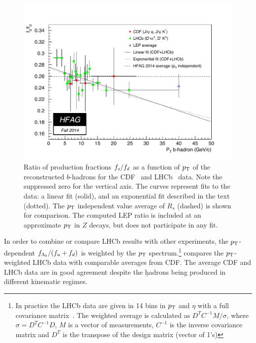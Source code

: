 \begin{figure}
 \begin{center}
  \includegraphics[width=\textwidth]{figures/life_mix/rs_comb}
  \caption{Ratio of production fractions $f_{s}/f_{d}$ as 
   a function of $p_{\rm T}$ of the reconstructed $b$-hadrons for the 
   CDF~\cite{CDFnote10795:2012} and LHCb~\cite{Aaij:2013qqa}
   data. Note the suppressed zero for the vertical axis.
   The curves represent fits to the data:
   a linear fit (solid), and an exponential fit described in the text (dotted).
   The $p_{\rm T}$ independent value average of $R_s$ (dashed) is shown for 
   comparison.
   The computed LEP ratio is included at an 
   approximate $p_{\rm T}$ in $Z$ decays, but does not participate in any fit.}
 \end{center}
\end{figure}

In order to combine or compare LHCb results with other experiments,
the $p_{\rm T}$-dependent $f_{\Lambda_{b}}/(f_{u} + f_{d})$ is weighted by the $p_{\rm T}$ spectrum.\footnote{
  \label{foot:life_mix:Aaij:2011jp}
  In practice the LHCb data are given in 14 bins in $p_{\rm T}$ and $\eta$ with a full covariance matrix~\cite{Aaij:2011jp}. 
  The weighted average is calculated as
  $D^T C^{-1} M/\sigma$, where $\sigma = D^T C^{-1} D$, $M$ is a vector 
  of measurements, $C^{-1}$ is the inverse covariance matrix and $D^T$ is the 
  transpose of the design matrix (vector of 1's)}
 compares 
the $p_{\rm T}$-weighted LHCb data with comparable averages from CDF. 
The average CDF 
and LHCb data are in good agreement despite the \b hadrons being produced 
in different kinematic regimes.

